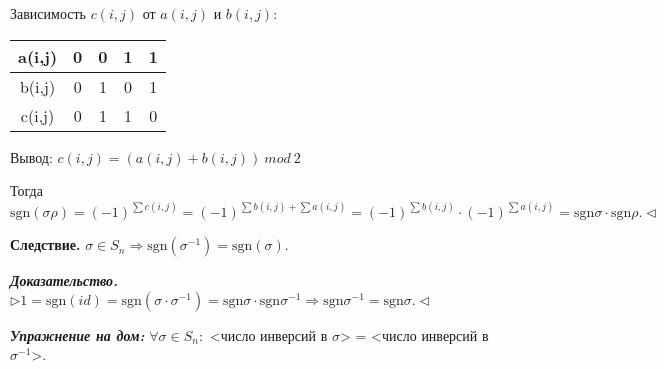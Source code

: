 \vspace{\baselineskip}
Зависимость $c(i,j)$ от $a(i,j)$ и $b(i,j)$:

\begin{table}[!ht]
		\begin{tabular}{c|c|c|c|c}
    	a(i,j) & 0 & 0 & 1 & 1 \\
        \hline
       b(i,j) & 0 & 1 & 0 & 1 \\
       \hline
          c(i,j) & 0 & 1 & 1 & 0 \\
		\end{tabular}
\end{table}

Вывод: $c(i,j) = (a(i,j) + b(i,j))\ mod\ 2$

Тогда $\mathrm{sgn}(\sigma \rho) = (-1)^{\sum c(i,j)} = (-1)^{\sum b(i,j) + \sum a(i,j)} = (-1)^{\sum b(i,j)} \cdot (-1)^{\sum a(i,j)} = \mathrm{sgn} \sigma \cdot \mathrm{sgn} \rho. \lhd$

\vspace{\baselineskip}
\textbf{Следствие.} $\sigma \in S_n \Rightarrow \mathrm{sgn} (\sigma^{-1}) = \mathrm{sgn}(\sigma)$.

\vspace{\baselineskip}
\textbf{\textit{Доказательство.}} $\rhd 1 = \mathrm{sgn}(id) = \mathrm{sgn}(\sigma \cdot \sigma^{-1}) = \mathrm{sgn} \sigma \cdot \mathrm{sgn} \sigma^{-1} \Rightarrow \mathrm{sgn} \sigma^{-1} = \mathrm{sgn} \sigma. \lhd$

\vspace{\baselineskip}
\textbf{\textit{Упражнение на дом:}} $\forall \sigma \in S_n:$ <число инверсий в $\sigma$> = <число инверсий в $\sigma^{-1}$>.

